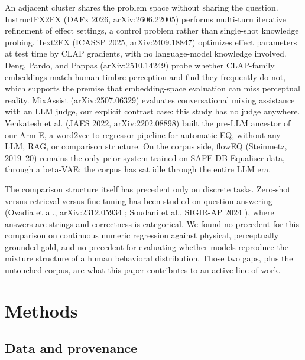 \documentclass[11pt]{article}
\begin{document}
An adjacent cluster shares the problem space without sharing the question. InstructFX2FX (DAFx 2026, arXiv:2606.22005) \cite{instructfx2fx2026} performs multi-turn iterative refinement of effect settings, a control problem rather than single-shot knowledge probing. Text2FX (ICASSP 2025, arXiv:2409.18847) \cite{text2fx2025} optimizes effect parameters at test time by CLAP gradients, with no language-model knowledge involved. Deng, Pardo, and Pappas (arXiv:2510.14249) \cite{deng2025clap} probe whether CLAP-family embeddings match human timbre perception and find they frequently do not, which supports the premise that embedding-space evaluation can miss perceptual reality. MixAssist (arXiv:2507.06329) \cite{mixassist2025} evaluates conversational mixing assistance with an LLM judge, our explicit contrast case: this study has no judge anywhere. Venkatesh et al. (JAES 2022, arXiv:2202.08898) \cite{venkatesh2022word} built the pre-LLM ancestor of our Arm E, a word2vec-to-regressor pipeline for automatic EQ, without any LLM, RAG, or comparison structure. On the corpus side, flowEQ (Steinmetz, 2019--20) \cite{steinmetz2019floweq} remains the only prior system trained on SAFE-DB Equaliser data, through a beta-VAE; the corpus has sat idle through the entire LLM era.

The comparison structure itself has precedent only on discrete tasks. Zero-shot versus retrieval versus fine-tuning has been studied on question answering (Ovadia et al., arXiv:2312.05934 \cite{ovadia2023finetuning}; Soudani et al., SIGIR-AP 2024 \cite{soudani2024finetuning}), where answers are strings and correctness is categorical. We found no precedent for this comparison on continuous numeric regression against physical, perceptually grounded gold, and no precedent for evaluating whether models reproduce the mixture structure of a human behavioral distribution. Those two gaps, plus the untouched corpus, are what this paper contributes to an active line of work.

\section{Methods}

\subsection{Data and provenance}
\end{document}
